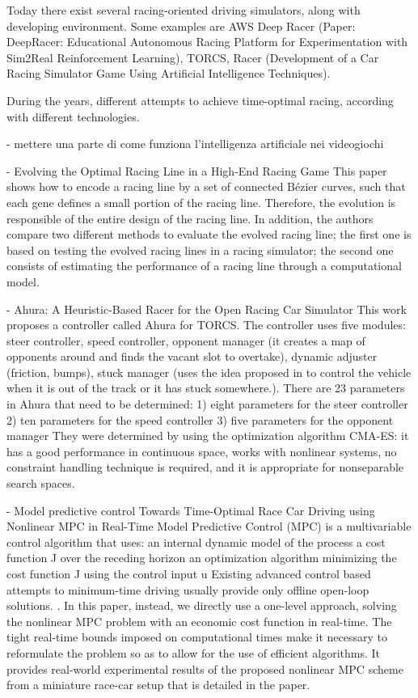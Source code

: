 Today there exist several racing-oriented driving simulators, along with developing environment. Some examples are AWS Deep Racer (Paper: DeepRacer: Educational Autonomous Racing Platform for Experimentation with Sim2Real Reinforcement Learning), TORCS, Racer (Development of a Car Racing Simulator Game Using Artificial Intelligence Techniques).

During the years, different attempts to achieve time-optimal racing, according with different technologies. 

- mettere una parte di come funziona l'intelligenza artificiale nei videogiochi


- Evolving the Optimal Racing Line in a High-End Racing Game
This paper shows how to encode a racing line by a set of connected Bézier curves, such that each gene defines a small portion of the racing line. Therefore, the evolution is responsible of the entire design of the racing line. In addition, the authors compare two different methods to evaluate the evolved racing line; the first one is based on testing the evolved racing lines in a racing simulator; the second one consists of estimating the performance of a racing line through a computational model.
	
- Ahura: A Heuristic-Based Racer for the Open Racing Car Simulator
This work proposes a controller called Ahura for TORCS. The controller uses five modules: steer controller, speed controller, opponent manager (it creates a map of opponents around  and finds the vacant slot to overtake), dynamic adjuster (friction, bumps), stuck manager (uses the idea proposed in to control the vehicle when it is out of the track or it has stuck somewhere.).
There are 23 parameters in Ahura that need to be determined:
1) eight parameters for the steer controller 
2) ten parameters for the speed controller 
3) five parameters for the opponent manager
They were determined by using the optimization algorithm CMA-ES: it has a good performance in continuous space, works with nonlinear systems, no constraint handling technique is required, and it is appropriate for nonseparable search spaces.


- Model predictive control Towards Time-Optimal Race Car Driving using Nonlinear MPC in
Real-Time
Model Predictive Control (MPC) is a multivariable control algorithm that uses:
an internal dynamic model of the process
a cost function J over the receding horizon
an optimization algorithm minimizing the cost function J using the control input u
Existing advanced control based attempts to minimum-time driving usually provide only offline open-loop solutions. . In this paper, instead, we directly use a one-level approach, solving the nonlinear MPC problem with an economic cost function in real-time. The tight real-time bounds imposed on computational times make it necessary to
reformulate the problem so as to allow for the use of efficient algorithms.
It provides real-world experimental results of the proposed nonlinear MPC scheme from a miniature race-car setup that is detailed in the paper. 


